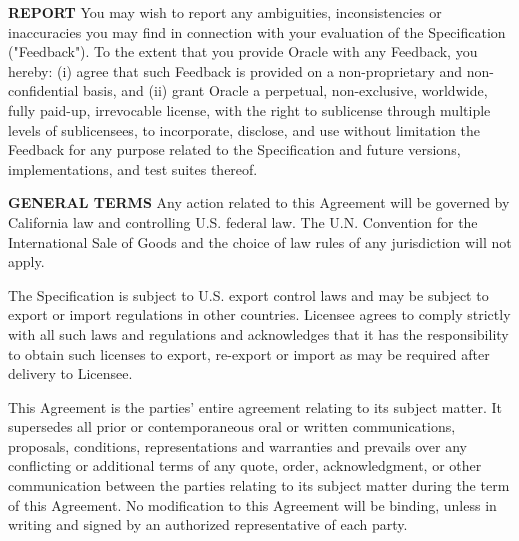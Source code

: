 \begin{flushleft}
{\bfseries REPORT}
You may wish to report any ambiguities, inconsistencies or inaccuracies you may find in connection with your evaluation of the Specification ("Feedback"). To the extent that you provide Oracle with any Feedback, you hereby: (i) agree that such Feedback is provided on a non-proprietary and non-confidential basis, and (ii) grant Oracle a perpetual, non-exclusive, worldwide, fully paid-up, irrevocable license, with the right to sublicense through multiple levels of sublicensees, to incorporate, disclose, and use without limitation the Feedback for any purpose related to the Specification and future versions, implementations, and test suites thereof.

{\bfseries GENERAL TERMS}
Any action related to this Agreement will be governed by California law and controlling U.S. federal law. The U.N. Convention for the International Sale of Goods and the choice of law rules of any jurisdiction will not apply.

The Specification is subject to U.S. export control laws and may be subject to export or import regulations in other countries. Licensee agrees to comply strictly with all such laws and regulations and acknowledges that it has the responsibility to obtain such licenses to export, re-export or import as may be required after delivery to Licensee.

This Agreement is the parties' entire agreement relating to its subject matter. It supersedes all prior or contemporaneous oral or written communications, proposals, conditions, representations and warranties and prevails over any conflicting or additional terms of any quote, order, acknowledgment, or other communication between the parties relating to its subject matter during the term of this Agreement. No modification to this Agreement will be binding, unless in writing and signed by an authorized representative of each party.

\end{flushleft}
